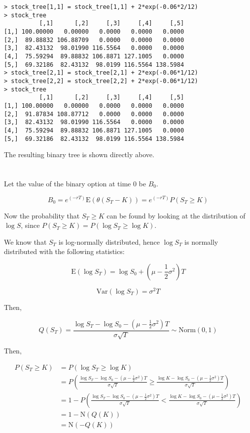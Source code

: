 \documentclass[11pt]{scrartcl}
\newcommand{\epower}[1]{\ensuremath{e^{\left(#1\right)}}}
\newcommand{\expectation}[1]{\ensuremath{\mathrm{E}{\left(#1\right)}}}
\begin{document}
\begin{lstlisting}
> stock_tree[1,1] = stock_tree[1,1] + 2*exp(-0.06*2/12)
> stock_tree
          [,1]      [,2]     [,3]     [,4]     [,5]
[1,] 100.00000   0.00000   0.0000   0.0000   0.0000
[2,]  89.88832 106.88709   0.0000   0.0000   0.0000
[3,]  82.43132  98.01990 116.5564   0.0000   0.0000
[4,]  75.59294  89.88832 106.8871 127.1005   0.0000
[5,]  69.32186  82.43132  98.0199 116.5564 138.5984
> stock_tree[2,1] = stock_tree[2,1] + 2*exp(-0.06*1/12)
> stock_tree[2,2] = stock_tree[2,2] + 2*exp(-0.06*1/12)
> stock_tree
          [,1]      [,2]     [,3]     [,4]     [,5]
[1,] 100.00000   0.00000   0.0000   0.0000   0.0000
[2,]  91.87834 108.87712   0.0000   0.0000   0.0000
[3,]  82.43132  98.01990 116.5564   0.0000   0.0000
[4,]  75.59294  89.88832 106.8871 127.1005   0.0000
[5,]  69.32186  82.43132  98.0199 116.5564 138.5984
\end{lstlisting}

The resulting binary tree is shown directly above.

\section{}

Let the value of the binary option at time $0$ be $B_0$.

\[B_0 = \epower{-rT} \expectation{\theta(S_T - K)} = \epower{-rT} P(S_T \geq K)\]

Now the probability that $S_T \geq K$ can be found by looking at the distribution of $\log{S}$, since $P(S_T \geq K) = P(\log{S_T} \geq \log{K})$.

We know that $S_T$ is log-normally distributed, hence $\log{S_T}$ is normally distributed with the following statistics:

\[\expectation{\log{S_T}} = \log{S_0} + \left(\mu - \frac{1}{2} \sigma^2\right)T\]

\[\mathrm{Var}\left(\log{S_T}\right) = \sigma^2 T\]

Then,

\[Q(S_T) = \frac{\log{S_T} - \log{S_0} - \left(\mu - \frac{1}{2}\sigma^2\right)T}{\sigma \sqrt{T}}\sim \mathrm{Norm}(0,1)\]

Then,

\begin{align*}
P(S_T \geq K) &= P(\log{S_T} \geq \log{K}) \\
&= P\left(\frac{\log{S_T} - \log{S_0} - \left(\mu - \frac{1}{2}\sigma^2\right)T}{\sigma \sqrt{T}} \geq \frac{\log{K} - \log{S_0} - \left(\mu - \frac{1}{2}\sigma^2\right)T}{\sigma \sqrt{T}} \right) \\
&= 1 - P\left(\frac{\log{S_T} - \log{S_0} - \left(\mu - \frac{1}{2}\sigma^2\right)T}{\sigma \sqrt{T}} < \frac{\log{K} - \log{S_0} - \left(\mu - \frac{1}{2}\sigma^2\right)T}{\sigma \sqrt{T}} \right) \\
&= 1 - \mathrm{N}(Q(K)) \\
&= \mathrm{N}(-Q(K))
\end{align*}
\end{document}
